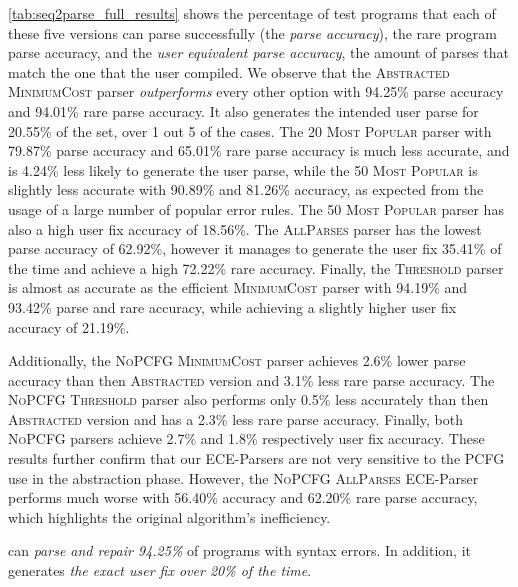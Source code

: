 \autoref{tab:seq2parse_full_results} shows the percentage of test programs that
each of these five versions can parse successfully (\ie the \emph{parse
accuracy}), the rare program parse accuracy, and the \emph{user equivalent parse
accuracy}, \ie the amount of parses that match the one that the user compiled.
We observe that the \textsc{Abstracted} \textsc{MinimumCost} parser
\emph{outperforms} every other option with 94.25\% parse accuracy and 94.01\%
rare parse accuracy. It also generates the intended user parse for 20.55\% of
the set, \ie over 1 out 5 of the cases. The \textsc{20 Most Popular} parser with
79.87\% parse accuracy and 65.01\% rare parse accuracy is much less accurate,
and is 4.24\% less likely to generate the user parse, while the \textsc{50 Most
Popular} is slightly less accurate with 90.89\% and 81.26\% accuracy, as
expected from the usage of a large number of popular error rules. The \textsc{50
Most Popular} parser has also a high user fix accuracy of 18.56\%. The
\textsc{AllParses} parser has the lowest parse accuracy of 62.92\%, however it
manages to generate the user fix 35.41\% of the time and achieve a high 72.22\%
rare accuracy. Finally, the \textsc{Threshold} parser is almost as accurate as
the efficient \textsc{MinimumCost} parser with 94.19\% and 93.42\% parse and
rare accuracy, while achieving a slightly higher user fix accuracy of 21.19\%.

Additionally, the \textsc{NoPCFG} \textsc{MinimumCost} parser achieves 2.6\%
lower parse accuracy than then \textsc{Abstracted} version and 3.1\% less rare
parse accuracy. The \textsc{NoPCFG} \textsc{Threshold} parser also performs only
0.5\% less accurately than then \textsc{Abstracted} version and has a 2.3\% less
rare parse accuracy. Finally, both \textsc{NoPCFG} parsers achieve 2.7\% and
1.8\% respectively user fix accuracy. These results further confirm that our
ECE-Parsers are not very sensitive to the PCFG use in the abstraction phase.
However, the \textsc{NoPCFG} \textsc{AllParses} ECE-Parser performs much worse
with 56.40\% accuracy and 62.20\% rare parse accuracy, which highlights the
original algorithm's inefficiency.

\begin{framed}
  \noindent \toolname can \emph{parse and repair 94.25\%} of programs with
  syntax errors. In addition, it generates \emph{the exact user fix over 20\% of
  the time}.
\end{framed}

